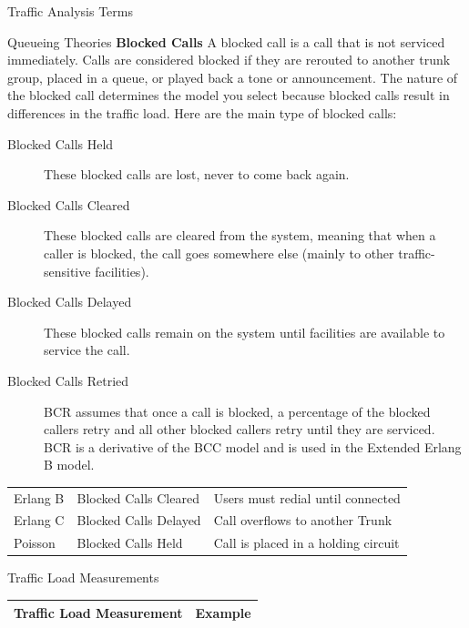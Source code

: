 \documentclass[landscape,fontscale=1,margin=0.2cm,paperwidth=70truecm, paperheight=40truecm,debug]{baposter}
\begin{document}
\begin{poster}
\begin{posterbox}[column=0]{Traffic Analysis Terms}
\begin{description}
\end{description}
\end{posterbox}

\begin{posterbox}[column=0,below=auto,textborder=rounded]{Queueing Theories}
\textbf{Blocked Calls} A blocked call is a call that is not serviced immediately. Calls are considered blocked if they are rerouted to another trunk group, placed in a queue, or played back a tone or announcement. The nature of the blocked call determines the model you select because blocked calls result in differences in the traffic load. Here are the main type of blocked calls:
\begin{description}
\item[Blocked Calls Held] These blocked calls are lost, never to come back again. 
\item[Blocked Calls Cleared] These blocked calls are cleared from the system, meaning that when a caller is blocked, the call goes somewhere else (mainly to other traffic-sensitive facilities).
\item[Blocked Calls Delayed] These blocked calls remain on the system until facilities are available to service the call.
\item[Blocked Calls Retried] BCR assumes that once a call is blocked, a percentage of the blocked callers retry and all other blocked callers retry until they are serviced. BCR is a derivative of the BCC model and is used in the Extended Erlang B model.
\end{description}
\begin{center}
\begin{tabular}{lll}
Erlang B & Blocked Calls Cleared & Users must redial until connected\\
Erlang C & Blocked Calls Delayed & Call overflows to another Trunk\\
Poisson & Blocked Calls Held & Call is placed in a holding circuit\\
\end{tabular}
\end{center}
\end{posterbox}

\begin{posterbox}[column=0,below=auto,height=bottom]{Traffic Load Measurements}
\begin{center}
\begin{tabular}{|c|c|}
\hline
Traffic Load Measurement & Example\\\hline


\end{tabular}
\end{center}
\end{posterbox}
\end{poster}
\end{document}
